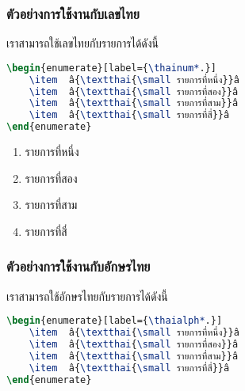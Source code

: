 \documentclass[11pt]{ltxguide}
\renewcommand{\baselinestretch}{1.5}
\begin{document}
\newpage
\subsubsection{ตัวอย่างการใช้งานกับเลขไทย}

เราสามารถใช้เลขไทยกับรายการได้ดังนี้

\smallskip
\renewcommand{\baselinestretch}{0.1}
\begin{lstlisting}[language=LaTeX,escapechar={â},basicstyle=\ttfamily,lineskip={0.05pc}]
\begin{enumerate}[label={\thainum*.}]
    \item  â{\textthai{\small รายการที่หนึ่ง}}â
    \item  â{\textthai{\small รายการที่สอง}}â
    \item  â{\textthai{\small รายการที่สาม}}â
    \item  â{\textthai{\small รายการที่สี่}}â
\end{enumerate}
\end{lstlisting}
\renewcommand{\baselinestretch}{1.5}

\begin{enumerate}[topsep=0pc,itemsep=0pc,label={\thainum*.}]
    \item  รายการที่หนึ่ง
    \item  รายการที่สอง
    \item  รายการที่สาม
    \item  รายการที่สี่
\end{enumerate}

\subsubsection{ตัวอย่างการใช้งานกับอักษรไทย}

เราสามารถใช้อักษรไทยกับรายการได้ดังนี้

\smallskip
\renewcommand{\baselinestretch}{0.1}
\begin{lstlisting}[language=LaTeX,escapechar={â},basicstyle=\ttfamily,lineskip={0.05pc}]
\begin{enumerate}[label={\thaialph*.}]
    \item  â{\textthai{\small รายการที่หนึ่ง}}â
    \item  â{\textthai{\small รายการที่สอง}}â
    \item  â{\textthai{\small รายการที่สาม}}â
    \item  â{\textthai{\small รายการที่สี่}}â
\end{enumerate}
\end{lstlisting}
\renewcommand{\baselinestretch}{1.5}
\end{document}
